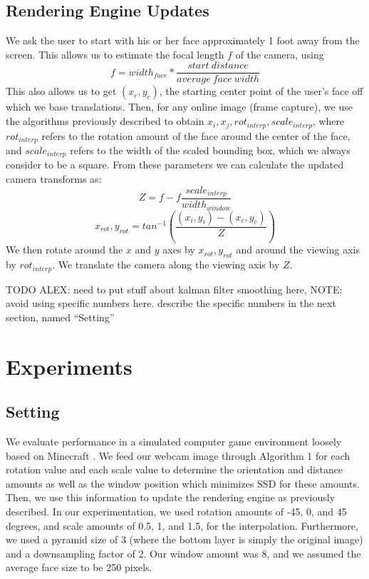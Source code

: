 \documentclass[10pt,twocolumn,letterpaper]{article}
\begin{document}
\subsection*{Rendering Engine Updates}
We ask the user to start with his or her face approximately 1 foot away from the screen. This allows us to estimate the focal length $f$ of the camera, using
$$f = width_{face} * \frac{start\ distance}{average\ face\ width}$$
This also allows us to get $(x_c, y_c)$, the starting center point of the user's face off which we base translations.
Then, for any online image (frame capture), we use the algorithms previously described to obtain $x_i, x_j, rot_{interp}, scale_{interp}$, where $rot_{interp}$ refers to the rotation amount of the face around the center of the face, and $scale_{interp}$ refers to the width of the scaled bounding box, which we always consider to be a square. From these parameters we can calculate the updated camera transforms as:
$$Z = f - f \frac{scale_{interp}}{width_{window}}$$
$$x_{rot}, y_{rot} = tan^{-1}(\frac{(x_i,y_i)-(x_c,y_c)}{Z})$$
We then rotate around the $x$ and $y$ axes by $x_{rot}, y_{rot}$ and around the viewing axis by $rot_{interp}$. We translate the camera along the viewing axis by $Z$.

TODO ALEX: need to put stuff about kalman filter \cite{kalman} smoothing here,
NOTE: avoid using specific numbers here. describe the specific numbers in
the next section, named ``Setting''

\section*{Experiments}

\subsection*{Setting}
We evaluate performance in a simulated computer game environment loosely based
on Minecraft \cite{minecraft}. We feed our webcam image through Algorithm 1 for each rotation
value and each scale value to determine the orientation and distance amounts as well as
the window position which minimizes SSD for these amounts. Then, we use this
information to update the rendering engine as previously described. In our experimentation,
we used rotation amounts of -45, 0, and 45 degrees, and scale amounts of 0.5, 1, and 1.5,
for the interpolation. Furthermore, we used a pyramid size of 3 (where the bottom
layer is simply the original image) and a downsampling factor of 2. Our window amount
was 8, and we assumed the average face size to be 250 pixels.
\end{document}
